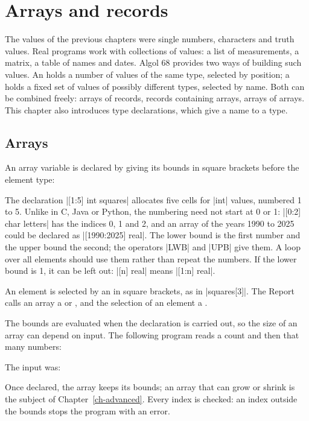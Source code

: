 \chapter{Arrays and records}\label{ch-data}

The values of the previous chapters were single numbers, characters and
truth values. Real programs work with collections of values: a list of
measurements, a matrix, a table of names and dates. Algol 68 provides two
ways of building such values. An  holds a number of values of
the same type, selected by position; a  holds a fixed set of
values of possibly different types, selected by name. Both can be
combined freely: arrays of records, records containing arrays, arrays of
arrays. This chapter also introduces type declarations, which give a
name to a type.

\section{Arrays}\label{sec-arrays}

An array variable is declared by giving its bounds in square brackets
before the element type:


The declaration \code|[1:5] int squares| allocates five cells for
\code|int| values, numbered 1 to 5. Unlike in C, Java or Python, the
numbering need not start at 0 or 1: \code|[0:2] char letters| has the
indices 0, 1 and 2, and an array of the years 1990 to 2025 could be
declared as \code|[1990:2025] real|. The lower bound is the first number
and the upper bound the second; the operators \code|LWB| and \code|UPB|
give them. A loop over all elements should use them rather than repeat
the numbers. If the lower bound is 1, it can be left out: \code|[n] real|
means \code|[1:n] real|.

An element is selected by an  in square brackets, as in
\code|squares[3]|. The Report calls an array a  or
, and the selection of an element a .

The bounds are evaluated when the declaration is carried out, so the size
of an array can depend on input. The following program reads a count and
then that many numbers:


\noindent The input was:


Once declared, the array keeps its bounds; an array that can grow or
shrink is the subject of Chapter~\ref{ch-advanced}. Every index is checked: an index
outside the bounds stops the program with an error.

